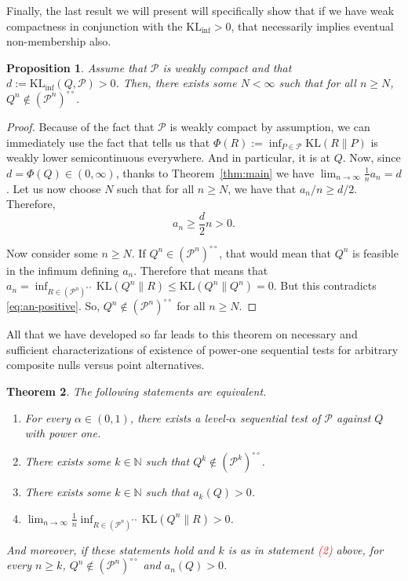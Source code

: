\documentclass[11pt]{article}
\newcommand{\KL}{\mathrm{KL}}
\newcommand{\KLinf}{\mathrm{KL}_{\mathrm{inf}}}
\newcommand{\Pcal}{\mathcal{P}}
\newcommand{\bPn}{(\mathcal{P}^n)^{\circ\circ}}
\newtheorem{theorem}{Theorem}[section]
\newtheorem{proposition}[theorem]{Proposition}
\theoremstyle{definition}
\theoremstyle{definition}
\begin{document}
\noindent Finally, the last result we will present will specifically show that if we have weak compactness in conjunction with the $\KLinf>0$, that necessarily implies eventual non-membership also.

\begin{proposition}\label{prop:compact-implies-out-eventual}
Assume that $\Pcal$ is weakly compact and that $d:=\KLinf(Q,\Pcal)>0$. Then, there exists some $N<\infty$ such that for all $n\ge N$, $Q^n\notin\bPn$.   
\end{proposition}

\begin{proof}
Because of the fact that $\Pcal$ is weakly compact by assumption, we can immediately use the fact that \parencite[Lemma~3]{ram2026powersequentialtestsexist} tells us that $\Phi(R):=\inf_{P\in\Pcal}\KL(R\|P)$ is weakly lower semicontinuous everywhere. And in particular, it is at $Q$. Now, since $d=\Phi(Q)\in(0,
\infty)$, thanks to Theorem~\ref{thm:main} we have $\lim_{n\to\infty}\frac{1}{n}a_n=d$. Let us now choose $N$ such that for all $n\ge N$, we have that $a_n/n \ge d/2$. Therefore,
\begin{equation}\label{eq:an-positive}
a_n\ge \frac{d}{2}n>0.    
\end{equation}

\noindent Now consider some $n\ge N$. If $Q^n\in\bPn$, that would mean that $Q^n$ is feasible in the infimum defining $a_n$. Therefore that means that $a_n=\inf_{R\in\bPn}\KL(Q^n\|R)\le \KL(Q^n\|Q^n)=0$. But this contradicts \eqref{eq:an-positive}. So, $Q^n\notin\bPn$ for all $n\ge N$.
\end{proof}

All that we have developed so far leads to this theorem on necessary and sufficient characterizations of existence of power-one sequential tests for arbitrary composite nulls versus point alternatives.

\begin{theorem}\label{thm:powerone-characterization}
The following statements are equivalent.
\begin{enumerate}
    \item For every $\alpha\in(0,1)$, there exists a level-$\alpha$ sequential test of $\Pcal$ against $Q$ with power one.
    \item There exists some $k\in\mathbb N$ such that $Q^k \notin (\Pcal^k)^{\circ\circ}$.
    \item There exists some $k\in\mathbb N$ such that $a_k(Q)>0$.
    \item $\lim_{n\to\infty}\frac{1}{n}\inf_{R\in(\Pcal^n)^{\circ\circ}}\KL(Q^n\|R)>0$.
\end{enumerate}
And moreover, if these statements hold and $k$ is as in statement \textcolor{red}{(2)} above, for every $n\ge k$, $Q^n\notin (\Pcal^n)^{\circ\circ}$ and $a_n(Q)>0$.
\end{theorem}
\end{document}
